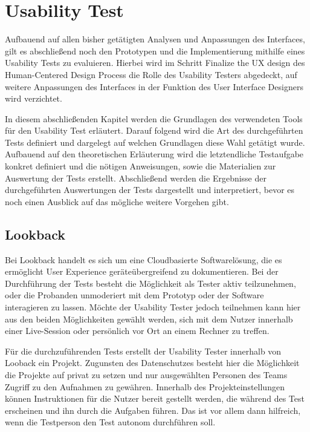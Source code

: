 \chapter{Usability Test}\label{ch:outlook}

Aufbauend auf allen bisher getätigten Analysen und Anpassungen des Interfaces, gilt es abschließend noch den Prototypen und die Implementierung mithilfe eines Usability Tests zu evaluieren.
Hierbei wird im Schritt \glqq Finalize the UX design\grqq{} des Human-Centered Design Process die Rolle des Usability Testers abgedeckt, auf weitere Anpassungen des Interfaces in der Funktion des User Interface Designers wird verzichtet.

In diesem abschließenden Kapitel werden die Grundlagen des verwendeten Tools für den Usability Test erläutert.
Darauf folgend wird die Art des durchgeführten Tests definiert und dargelegt auf welchen Grundlagen diese Wahl getätigt wurde.
Aufbauend auf den theoretischen Erläuterung wird die letztendliche Testaufgabe konkret definiert und die nötigen Anweisungen, sowie die Materialien zur Auswertung der Tests erstellt.
Abschließend werden die Ergebnisse der durchgeführten Auswertungen der Tests dargestellt und interpretiert, bevor es noch einen Ausblick auf das mögliche weitere Vorgehen gibt.

\section{Lookback}

Bei Lookback handelt es sich um eine Cloudbasierte Softwarelösung, die es ermöglicht User Experience geräteübergreifend zu dokumentieren.
Bei der Durchführung der Tests besteht die Möglichkeit als Tester aktiv teilzunehmen, oder die Probanden unmoderiert mit dem Prototyp oder der Software interagieren zu lassen.
Möchte der Usability Tester jedoch teilnehmen kann hier aus den beiden Möglichkeiten gewählt werden, sich mit dem Nutzer innerhalb einer Live-Session oder  persönlich vor Ort an einem Rechner zu treffen.

Für die durchzuführenden Tests erstellt der Usability Tester innerhalb von Looback ein Projekt.
Zugunsten des Datenschutzes besteht hier die Möglichkeit die Projekte auf privat zu setzen und nur ausgewählten Personen des Teams Zugriff zu den Aufnahmen zu gewähren.
Innerhalb des Projekteinstellungen können Instruktionen für die Nutzer bereit gestellt werden, die während des Test erscheinen und ihn durch die Aufgaben führen.
Das ist vor allem dann hilfreich, wenn die Testperson den Test autonom durchführen soll.

